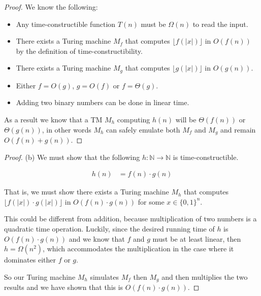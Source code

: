 \documentclass[usletter]{article}
\begin{document}
\begin{enumerate}
\begin{proof}
      We know the following:

      \begin{itemize}
        \item Any time-constructible function $T(n)$ must be $\Omega(n)$ to read the input.

        \item There exists a Turing machine $M_f$ that computes $\lfloor f(|x|) \rfloor$ in $O(f(n))$ by the definition of time-constructibility.

        \item There exists a Turing machine $M_g$ that computes $\lfloor g(|x|) \rfloor$ in $O(g(n))$.

        \item Either $f = O(g)$, $g = O(f)$ or $f = \Theta(g)$.

        \item Adding two binary numbers can be done in linear time.
      \end{itemize}

      As a result we know that a TM $M_h$ computing $h(n)$ will be $\Theta(f(n))$ or $\Theta(g(n))$, in other words $M_h$ can safely emulate both $M_f$ and $M_g$ and remain $O(f(n) + g(n))$.
    \end{proof}

    \begin{proof} (b)
      We must show that the following $h : \mathbb{N} \rightarrow \mathbb{N}$ is time-constructible.

      \begin{align*}
        h(n) &= f(n) \cdot g(n)
      \end{align*}

      That is, we must show there exists a Turing machine $M_h$ that computes $\lfloor f(|x|) \cdot g(|x|) \rfloor$ in $O(f(n) \cdot g(n))$ for some $x \in \{0,1\}^n$.

      This could be different from addition, because multiplication of two numbers is a quadratic time operation. Luckily, since the desired running time of $h$ is $O(f(n) \cdot g(n))$ and we know that $f$ and $g$ must be at least linear, then $h = \Omega(n^2)$, which accommodates the multiplication in the case where it dominates either $f$ or $g$.

      So our Turing machine $M_h$ simulates $M_f$ then $M_g$ and then multiplies the two results and we have shown that this is $O(f(n) \cdot g(n))$.

    \end{proof}


\end{enumerate}
\end{document}
